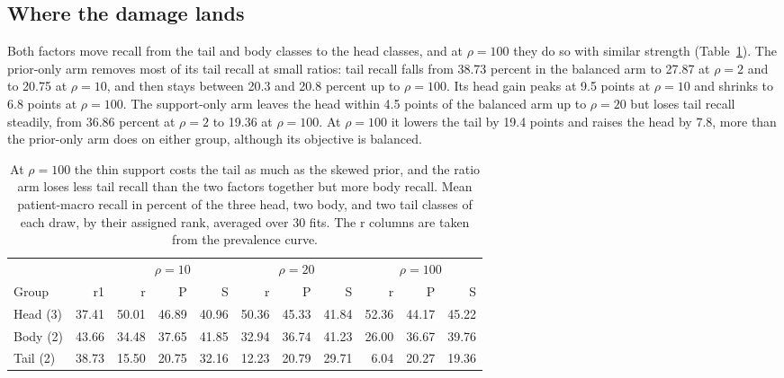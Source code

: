 \subsection{Where the damage lands}
\label{sec:rank-results}
Both factors move recall from the tail and body classes to the head classes, and at $\rho=100$ they do so with similar strength (Table~\ref{tab:thirds}). The prior-only arm removes most of its tail recall at small ratios: tail recall falls from 38.73 percent in the balanced arm to 27.87 at $\rho=2$ and to 20.75 at $\rho=10$, and then stays between 20.3 and 20.8 percent up to $\rho=100$. Its head gain peaks at 9.5 points at $\rho=10$ and shrinks to 6.8 points at $\rho=100$. The support-only arm leaves the head within 4.5 points of the balanced arm up to $\rho=20$ but loses tail recall steadily, from 36.86 percent at $\rho=2$ to 19.36 at $\rho=100$. At $\rho=100$ it lowers the tail by 19.4 points and raises the head by 7.8, more than the prior-only arm does on either group, although its objective is balanced.

\begin{table}[htbp]
\centering
\small
\renewcommand{\arraystretch}{1.15}
\begin{tabular}{@{}lrrrrrrrrrr@{}}
\toprule
 & & \multicolumn{3}{c}{$\rho=10$} & \multicolumn{3}{c}{$\rho=20$} & \multicolumn{3}{c}{$\rho=100$} \\
\cmidrule(lr){3-5}\cmidrule(lr){6-8}\cmidrule(lr){9-11}
Group & r1 & r & P & S & r & P & S & r & P & S \\
\midrule
Head (3) & 37.41 & 50.01 & 46.89 & 40.96 & 50.36 & 45.33 & 41.84 & 52.36 & 44.17 & 45.22 \\
Body (2) & 43.66 & 34.48 & 37.65 & 41.85 & 32.94 & 36.74 & 41.23 & 26.00 & 36.67 & 39.76 \\
Tail (2) & 38.73 & 15.50 & 20.75 & 32.16 & 12.23 & 20.79 & 29.71 & 6.04 & 20.27 & 19.36 \\
\bottomrule
\end{tabular}
\caption{At $\rho=100$ the thin support costs the tail as much as the skewed prior, and the ratio arm loses less tail recall than the two factors together but more body recall. Mean patient-macro recall in percent of the three head, two body, and two tail classes of each draw, by their assigned rank, averaged over 30 fits. The r columns are taken from the prevalence curve.}
\label{tab:thirds}
\end{table}

